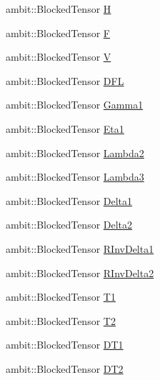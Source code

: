\begin{DoxyCompactItemize}
\item 
ambit\+::\+Blocked\+Tensor \mbox{\hyperlink{classforte_1_1_s_o_m_r_d_s_r_g_ae0d71204bfed5d18b4c4de4b57e14a5b}{H}}
\item 
ambit\+::\+Blocked\+Tensor \mbox{\hyperlink{classforte_1_1_s_o_m_r_d_s_r_g_a051b4339422de305d80471445d6fcf43}{F}}
\item 
ambit\+::\+Blocked\+Tensor \mbox{\hyperlink{classforte_1_1_s_o_m_r_d_s_r_g_a7622bcf46fdad30ab325008e244af10c}{V}}
\item 
ambit\+::\+Blocked\+Tensor \mbox{\hyperlink{classforte_1_1_s_o_m_r_d_s_r_g_a8f5dbceb6b7aee4c13fb3515efd63025}{D\+FL}}
\item 
ambit\+::\+Blocked\+Tensor \mbox{\hyperlink{classforte_1_1_s_o_m_r_d_s_r_g_ae9c5afd2c3ec489d1ba5a092ab3abe2b}{Gamma1}}
\item 
ambit\+::\+Blocked\+Tensor \mbox{\hyperlink{classforte_1_1_s_o_m_r_d_s_r_g_a1c4af38fba205ecaa7545b5ec6a223bf}{Eta1}}
\item 
ambit\+::\+Blocked\+Tensor \mbox{\hyperlink{classforte_1_1_s_o_m_r_d_s_r_g_afd0c74c4e2c3612b2577e1bb31611a4d}{Lambda2}}
\item 
ambit\+::\+Blocked\+Tensor \mbox{\hyperlink{classforte_1_1_s_o_m_r_d_s_r_g_a28ca926ad7fe1791ea1652f97f06b5e1}{Lambda3}}
\item 
ambit\+::\+Blocked\+Tensor \mbox{\hyperlink{classforte_1_1_s_o_m_r_d_s_r_g_a3870ddf1fadffa0e9586b4be7747ef0d}{Delta1}}
\item 
ambit\+::\+Blocked\+Tensor \mbox{\hyperlink{classforte_1_1_s_o_m_r_d_s_r_g_a4250a079ab67c5c8e74edc2805c07c9a}{Delta2}}
\item 
ambit\+::\+Blocked\+Tensor \mbox{\hyperlink{classforte_1_1_s_o_m_r_d_s_r_g_a5acda9a63d60f87391c38c7a8d335417}{R\+Inv\+Delta1}}
\item 
ambit\+::\+Blocked\+Tensor \mbox{\hyperlink{classforte_1_1_s_o_m_r_d_s_r_g_af4800f43188cfa68bd108056e4d9fa3e}{R\+Inv\+Delta2}}
\item 
ambit\+::\+Blocked\+Tensor \mbox{\hyperlink{classforte_1_1_s_o_m_r_d_s_r_g_a024bdc535cac58aed0013b9dd8de0a2a}{T1}}
\item 
ambit\+::\+Blocked\+Tensor \mbox{\hyperlink{classforte_1_1_s_o_m_r_d_s_r_g_ae7899934624bd03d7acd408d11f8009e}{T2}}
\item 
ambit\+::\+Blocked\+Tensor \mbox{\hyperlink{classforte_1_1_s_o_m_r_d_s_r_g_a31257bcae8f1f754d66c2f4025ebda90}{D\+T1}}
\item 
ambit\+::\+Blocked\+Tensor \mbox{\hyperlink{classforte_1_1_s_o_m_r_d_s_r_g_a57e9146586e842aefa885e8dd1347b47}{D\+T2}}

\end{DoxyCompactItemize}
